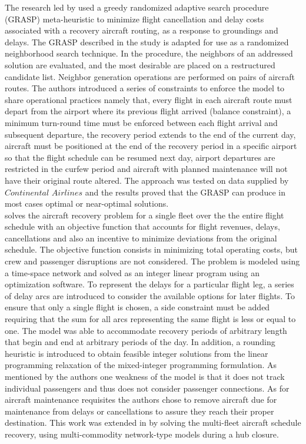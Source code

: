 \documentclass[ijoo,nonblindrev]{informs-ijoo}
\begin{document}
The research led by \citep{Arguello1997} used a greedy randomized adaptive search procedure (GRASP) meta-heuristic to minimize flight cancellation and delay costs associated with a recovery aircraft routing, as a response to groundings and delays. The GRASP described in the study is adapted for use as a randomized neighborhood search technique. In the procedure, the neighbors of an addressed solution are evaluated, and the most desirable are placed on a restructured candidate list. Neighbor generation operations are performed on pairs of aircraft routes. The authors introduced a series of constraints to enforce the model to share operational practices namely that, every flight in each aircraft route must depart from the airport where its previous flight arrived (balance constraint), a minimum turn-round time must be enforced between each flight arrival and subsequent departure, the recovery period extends to the end of the current day, aircraft must be positioned at the end of the recovery period in a specific airport so that the flight schedule can be resumed next day, airport departures are restricted in the curfew period and aircraft with planned maintenance will not have their original route altered. The approach was tested on data supplied by $Continental$ $Airlines$ and the results proved that  the GRASP can produce in  most cases optimal or near-optimal solutions.\\
\citep{THENGVALL2000} solves the aircraft recovery problem for a single fleet over the the entire flight schedule with an objective function that accounts for flight revenues, delays, cancellations and also an incentive to minimize deviations from the original schedule. The objective function consists in minimizing total operating costs, but crew and passenger disruptions are not considered. The problem is modeled using a time-space network and solved as an integer linear program using an optimization software.  To  represent the delays for a particular flight leg, a series  of delay arcs are introduced to consider the available options for later flights.  To  ensure   that only a single flight is chosen, a side constraint must be added requiring that the sum   for all arcs representing the same flight is less or equal to one. The model was able to accommodate recovery periods of arbitrary length that begin and end at arbitrary periods of the day. In addition, a rounding heuristic is introduced to obtain feasible integer solutions from the linear programming relaxation of the mixed-integer programming formulation. As mentioned by the authors one weakness of the model is that it does not track individual passengers and thus does not consider passenger connections. As for aircraft maintenance requisites the authors chose to remove aircraft due for maintenance from delays or cancellations to assure they reach their proper destination. This work was extended in \citep{Thengvall2001} by solving the multi-fleet aircraft schedule recovery, using multi-commodity network-type models during a hub closure.\\
\end{document}
